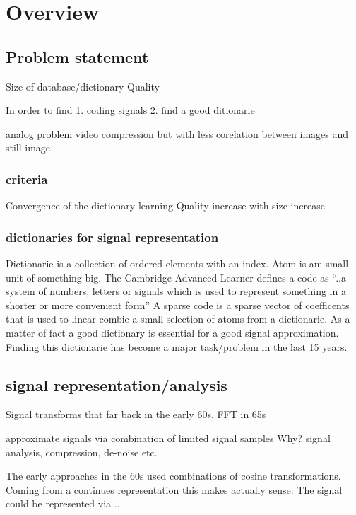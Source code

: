 \chapter{Overview}


\section{Problem statement}
Size of database/dictionary
Quality

In order to find 
1. coding signals 
2. find a good ditionarie

analog problem video compression but with less corelation between images and still image 

\subsection{criteria}
Convergence of the dictionary learning
Quality increase with size increase 

\subsection{dictionaries for signal representation}
Dictionarie is a collection of ordered elements with an index.
Atom is am small unit of something big.
The Cambridge Advanced Learner defines a code as ``..a system of numbers, letters or signals which is used to represent something in a shorter or more convenient form''
A sparse code is a sparse vector of coefficents that is used to linear combie a small selection of atoms from a dictionarie.
As a matter of fact a good dictionary is essential for a good signal approximation. \cite{} Finding this dictionarie has become a major task/problem in the last 15 years.

\section{signal representation/analysis}
Signal transforms \cite{sparse intro} that far back in the early 60s.
FFT in 65s

approximate signals via combination of limited signal samples
Why?
signal analysis, compression, de-noise etc.

The early approaches in the 60s used combinations of cosine transformations. Coming from a continues representation this makes 
actually sense. The signal could be represented via ....


